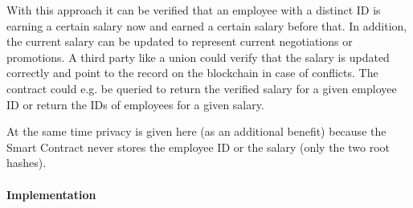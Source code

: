 With this approach it can be verified that an employee with a distinct ID is earning a certain salary now and earned a certain salary before that. In addition, the current salary can be updated to represent current negotiations or promotions. A third party like a union could verify that the salary is updated correctly and point to the record on the blockchain in case of conflicts. The contract could e.g. be queried to return the verified salary for a given employee ID or return the IDs of employees for a given salary.

At the same time privacy is given here (as an additional benefit) because the Smart Contract never stores the employee ID or the salary (only the two root hashes).


\paragraph{Implementation}
